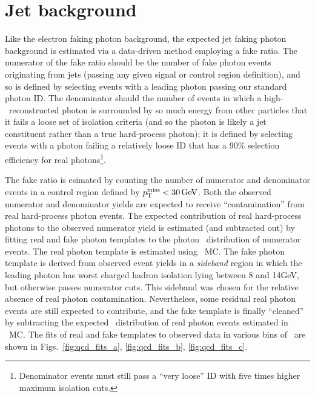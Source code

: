 \section{Jet background} \label{sec:background_estimation_jetfake}
Like the electron faking photon background, the expected jet faking photon background is estimated via a data-driven method employing a fake ratio.
The numerator of the fake ratio should be the number of fake photon events originating from jets (passing any given signal or control region definition), and so
is defined by selecting events with a leading photon passing our standard photon ID.
The denominator should the number of events in which a high-\ET\ reconstructed photon is surrounded by so much energy from other particles
that it fails a loose set of isolation criteria (and so the photon is likely a jet constituent rather than a true hard-process photon); it is defined by selecting events
with a photon failing a relatively loose ID that has a 90\% selection efficiency for real photons\footnote{Denominator events must still pass a
``very loose'' ID with five times higher maximum isolation cuts.}.

The fake ratio is esimated by counting the number of numerator and denominator events in a control region defined by $\MET < 30\unit{GeV}$. Both the observed
numerator and denominator yields are expected to receive ``contamination'' from real hard-process photon events. The expected contribution of real hard-process
photons to the observed numerator yield is estimated (and subtracted out) by fitting real and fake photon templates to the photon \sieie\ distribution of numerator
events. The real photon template is estimated using \gjets\ MC. The fake photon template is derived from observed event yields in a \textit{sideband} region in which
the leading photon has worst charged hadron isolation lying between 8 and 14\unit{GeV}, but otherwise passes numerator cuts.
This sideband was chosen for the relative absence of real photon contamination. Nevertheless, some residual real photon events are still expected to contribute, and
the fake template is finally ``cleaned'' by subtracting the expected \sieie\ distribution of real photon events estimated in \gjets\ MC. The fits of real and fake
templates to observed data in various bins of \pTgamma\ are shown in Figs.~\ref{fig:qcd_fits_a}, \ref{fig:qcd_fits_b}, \ref{fig:qcd_fits_c}.

